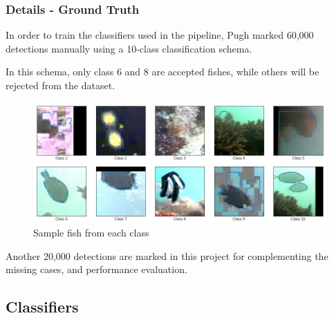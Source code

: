 \documentclass{beamer}[fullspacing]
\begin{document}
\begin{frame}
\frametitle{Details - Ground Truth}

In order to train the classifiers used in the pipeline, Pugh marked 60,000 detections manually using a 10-class classification schema.

\vspace{5pt}
In this schema, only class 6 and 8 are accepted fishes, while others will be rejected from the dataset.

\begin{figure}
\includegraphics[scale=0.2]{image/class_sample.png}
\caption{Sample fish from each class}
\end{figure}

\vspace{-15pt}
Another 20,000 detections are marked in this project for complementing the missing cases, and performance evaluation.

\end{frame}



\subsection{Classifiers}
\end{document}
